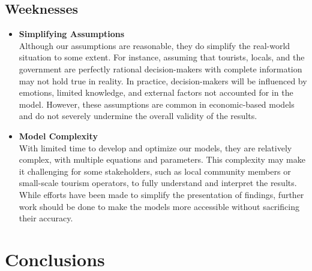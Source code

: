 \documentclass{mcmthesis}
\begin{document}
\subsection{Weeknesses}
\begin{itemize}
 \item \textbf{Simplifying Assumptions} \\
 Although our assumptions are reasonable, they do simplify the real-world situation to some extent.
 For instance, assuming that tourists, locals, and the government are perfectly rational decision-makers with complete information may not hold true in reality.
 In practice, decision-makers will be influenced by emotions, limited knowledge, and external factors not accounted for in the model.
 However, these assumptions are common in economic-based models and do not severely undermine the overall validity of the results.
 \item \textbf{Model Complexity} \\
 With limited time to develop and optimize our models, they are relatively complex, with multiple equations and parameters.
 This complexity may make it challenging for some stakeholders, such as local community members or small-scale tourism operators,
 to fully understand and interpret the results.
 While efforts have been made to simplify the presentation of findings, 
 further work should be done to make the models more accessible without sacrificing their accuracy.
\end{itemize}

\section{Conclusions}





\end{document}
